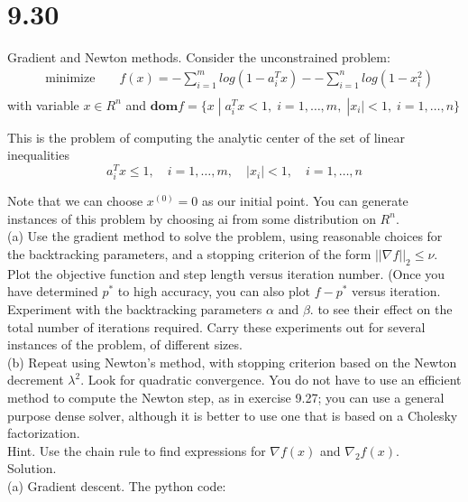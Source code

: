 \documentclass{article}
\begin{document}
\section*{9.30}
Gradient and Newton methods. Consider the unconstrained problem: \\
\begin{align*}
	&\text{minimize } && 
	f(x) = - \sum_{i=1}^m log(1 - a_i^T x) - 
	- \sum_{i=1}^n log(1 - x_i^2) \\
\end{align*}
with variable $x \in R^n$ and 
$\mathbf{dom} f =\{ x\; | \; a_i^T x < 1, \; 
i = 1, \dots, m, \; |x_i| < 1, \; i = 1, \dots, n \}$

This is the problem of computing the analytic center of the set of linear inequalities
$$
a_i^T x \leq 1, \quad i = 1, \dots, m, \quad |x_i| < 1, \quad i = 1, \dots, n
$$

Note that we can choose $x^{(0)} = 0$ as our initial point. You can generate instances of this
problem by choosing ai from some distribution on $R^n.$ \\

(a) Use the gradient method to solve the problem, using reasonable choices for the backtracking
parameters, and a stopping criterion of the form 
$||\nabla f||_2 \leq \nu.$ Plot the
objective function and step length versus iteration number. (Once you have determined $p^*$ to high accuracy, you can also plot $f - p^*$ versus iteration. Experiment
with the backtracking parameters $\alpha$ and $\beta.$ to see their effect on the total number of
iterations required. Carry these experiments out for several instances of the problem,
of different sizes. \\


(b) Repeat using Newton’s method, with stopping criterion based on the Newton decrement $\lambda ^ 2.$ Look for quadratic convergence. You do not have to use an efficient method
to compute the Newton step, as in exercise 9.27; you can use a general purpose dense
solver, although it is better to use one that is based on a Cholesky factorization.\\

Hint. Use the chain rule to find expressions for $\nabla f(x)$ and $\nabla_2 f(x)$.\\

Solution.\\

(a) Gradient descent. The python code:
\end{document}
